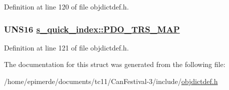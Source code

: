 Definition at line 120 of file objdictdef.h.\hypertarget{structs__quick__index_c91a86195b3615a98f7b07e0c51ac75f}{
\subsubsection[PDO\_\-TRS\_\-MAP]{\setlength{\rightskip}{0pt plus 5cm}UNS16 \hyperlink{structs__quick__index_c91a86195b3615a98f7b07e0c51ac75f}{s\_\-quick\_\-index::PDO\_\-TRS\_\-MAP}}}
\label{structs__quick__index_c91a86195b3615a98f7b07e0c51ac75f}




Definition at line 121 of file objdictdef.h.

The documentation for this struct was generated from the following file:\begin{CompactItemize}
\item 
/home/epimerde/documents/tc11/Can\-Festival-3/include/\hyperlink{objdictdef_8h}{objdictdef.h}\end{CompactItemize}
